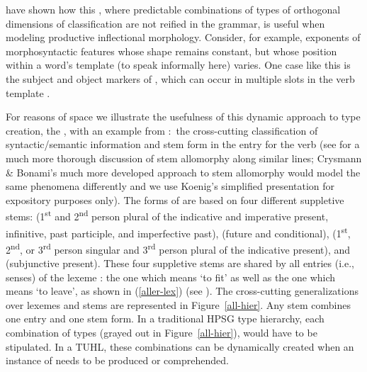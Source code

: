 \documentclass[output=paper,biblatex,babelshorthands,newtxmath,draftmode,colorlinks,citecolor=brown]{langscibook}
\begin{document}
\citet{CrysmannandBonami2016} have shown how this , where predictable combinations of types of orthogonal dimensions of classification are not reified in the grammar, is useful when modeling productive inflectional morphology. Consider, for example, exponents of morphosyntactic features whose shape remains constant, but whose position within a word's template (to speak informally here) varies. One case like this is the subject and object markers of , which can occur in multiple slots in the  verb template \citep{Stump1993b,BonamiandCrysmann2016}. 

For reasons of space we illustrate the usefulness of this dynamic approach to type creation, the , with an example from \citet{Koenig1999c}:\ the cross-cutting classification of syntactic/semantic information and stem form in the entry for the  verb  (see \citealt{BonamiandBoye2001} for a much more thorough discussion of  stem allomorphy along similar lines; Crysmann \& Bonami's much more developed approach to stem allomorphy would model the same phenomena differently and we use Koenig's simplified presentation for expository purposes only). The forms of  are based on four different suppletive stems:  (1\textsuperscript{st} and 2\textsuperscript{nd} person plural of the indicative and imperative present, infinitive, past participle, and imperfective past),  (future and conditional),  (1\textsuperscript{st}, 2\textsuperscript{nd}, or 3\textsuperscript{rd} person singular and 3\textsuperscript{rd} person plural of the indicative present), and  (subjunctive present). These four suppletive stems are shared by all entries (i.e., senses) of the lexeme : the one which means `to fit' as well as the one which means `to leave', as shown in (\ref{aller-lex}) (see \citealt[40--41]{Koenig1999c}). The cross-cutting generalizations over lexemes and stems are represented in Figure~\ref{all-hier}. Any  stem combines one entry and one stem form. In a traditional HPSG type hierarchy, each combination of types (grayed out in Figure~\ref{all-hier}), would have to be stipulated. In a TUHL, these combinations can be dynamically created when an instance of  needs to be produced or comprehended.
\end{document}
